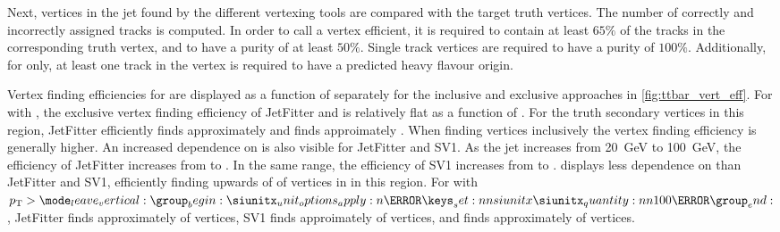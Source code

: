 Next, vertices in the jet found by the different vertexing tools are compared with the target truth vertices.
The number of correctly and incorrectly assigned tracks is computed.
In order to call a vertex efficient, it is required to contain at least $65\%$ of the tracks in the corresponding truth vertex, and to have a purity of at least $50\%$.
Single track vertices are required to have a purity of $100\%$.
Additionally, for \GNN only, at least one track in the vertex is required to have a predicted heavy flavour origin.



Vertex finding efficiencies for \ttbarbjets are displayed as a function of \pt separately for the inclusive and exclusive approaches in \cref{fig:ttbar_vert_eff}.
For \ttbarbjets with \ttbarpt, the exclusive vertex finding efficiency of JetFitter and \GNN is relatively flat as a function of \pt.
For the truth secondary vertices in this \pt region, JetFitter efficiently finds approximately  and \GNN finds approimately .
When finding vertices inclusively the vertex finding efficiency is generally higher.
An increased dependence on \pt is also visible for JetFitter and SV1. As the jet \pt increases from \SI{20}{\GeV} to \SI{100}{\GeV}, the efficiency of JetFitter increases from  to .
In the same range, the efficiency of SV1 increases from  to .
\GNN displays less dependence on \pt than JetFitter and SV1, efficiently finding upwards of  of vertices in \bjets in this \pt region. 
For \bjets with $\pt > \SI{100}{\GeV}$, JetFitter finds approximately  of vertices, SV1 finds approimately  of vertices, and \GNN finds approximately  of vertices.


